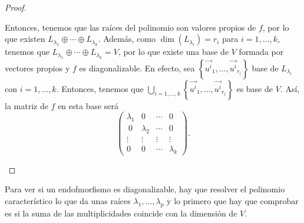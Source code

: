 \begin{proof}
\begin{description}
	Entonces, tenemos que las raíces del polinomio son valores propios de $\displaystyle f $, por lo que existen $\displaystyle L_{\lambda_{1}} \oplus \cdots \oplus L_{\lambda_{k}} $. Además, como $\displaystyle \dim\left(L_{\lambda_{i}}\right) = r_{i} $ para $\displaystyle i = 1, \ldots, k $, tenemos que $\displaystyle L_{\lambda_{1}}\oplus\cdots\oplus L_{\lambda_{k}} = V $, por lo que existe una base de $\displaystyle V $ formada por vectores propios y $\displaystyle f $ es diagonalizable. En efecto, sea $\displaystyle \left\{ \vec{u^{i}}_{1}, \ldots, \vec{u^{i}}_{r_{i}}\right\}  $ base de $\displaystyle L_{\lambda_{i}} $ con $\displaystyle i = 1, \ldots, k $. Entonces, tenemos que $\displaystyle \bigcup_{i = 1, \ldots, k} \left\{ \vec{u^{i}}_{1}, \ldots, \vec{u^{i}}_{r_{i}}\right\}  $ es base de $\displaystyle V $. Así, la matriz de $\displaystyle f $ en esta base será
\[ \begin{pmatrix} \lambda_{1} & 0 & \cdots & 0 \\\
0 & \lambda_{2} & \cdots & 0 \\
 \vdots & \vdots & \vdots & \vdots \\
0 & 0 & \cdots & \lambda_{k}\end{pmatrix}.\]
\end{description}
\end{proof}
\begin{observation}
\normalfont Para ver si un endofmorfismo es diagonalizable, hay que resolver el polinomio característico lo que da unas raíces $\displaystyle \lambda_{1}, \ldots, \lambda_{p} $ y lo primero que hay que comprobar es si la suma de las multiplicidades coincide con la dimensión de $\displaystyle V $.
\end{observation}

